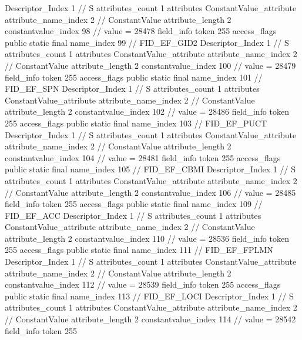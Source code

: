 {{{{{				Descriptor_Index	1		// S
				attributes_count	1
				attributes {
				ConstantValue_attribute {
					attribute_name_index	2		// ConstantValue
					attribute_length	2
					constantvalue_index	98		// value = 28478
				}
				}
			}
			field_info {
				token	255
				access_flags	public static final
				name_index	99		// FID_EF_GID2
				Descriptor_Index	1		// S
				attributes_count	1
				attributes {
				ConstantValue_attribute {
					attribute_name_index	2		// ConstantValue
					attribute_length	2
					constantvalue_index	100		// value = 28479
				}
				}
			}
			field_info {
				token	255
				access_flags	public static final
				name_index	101		// FID_EF_SPN
				Descriptor_Index	1		// S
				attributes_count	1
				attributes {
				ConstantValue_attribute {
					attribute_name_index	2		// ConstantValue
					attribute_length	2
					constantvalue_index	102		// value = 28486
				}
				}
			}
			field_info {
				token	255
				access_flags	public static final
				name_index	103		// FID_EF_PUCT
				Descriptor_Index	1		// S
				attributes_count	1
				attributes {
				ConstantValue_attribute {
					attribute_name_index	2		// ConstantValue
					attribute_length	2
					constantvalue_index	104		// value = 28481
				}
				}
			}
			field_info {
				token	255
				access_flags	public static final
				name_index	105		// FID_EF_CBMI
				Descriptor_Index	1		// S
				attributes_count	1
				attributes {
				ConstantValue_attribute {
					attribute_name_index	2		// ConstantValue
					attribute_length	2
					constantvalue_index	106		// value = 28485
				}
				}
			}
			field_info {
				token	255
				access_flags	public static final
				name_index	109		// FID_EF_ACC
				Descriptor_Index	1		// S
				attributes_count	1
				attributes {
				ConstantValue_attribute {
					attribute_name_index	2		// ConstantValue
					attribute_length	2
					constantvalue_index	110		// value = 28536
				}
				}
			}
			field_info {
				token	255
				access_flags	public static final
				name_index	111		// FID_EF_FPLMN
				Descriptor_Index	1		// S
				attributes_count	1
				attributes {
				ConstantValue_attribute {
					attribute_name_index	2		// ConstantValue
					attribute_length	2
					constantvalue_index	112		// value = 28539
				}
				}
			}
			field_info {
				token	255
				access_flags	public static final
				name_index	113		// FID_EF_LOCI
				Descriptor_Index	1		// S
				attributes_count	1
				attributes {
				ConstantValue_attribute {
					attribute_name_index	2		// ConstantValue
					attribute_length	2
					constantvalue_index	114		// value = 28542
				}
				}
			}
			field_info {
				token	255
}}}}}
